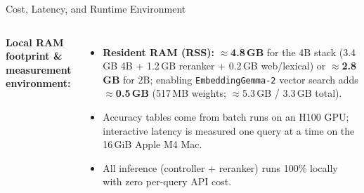 \documentclass[aspectratio=1610,11pt]{beamer}
\begin{document}
\begin{frame}{Cost, Latency, and Runtime Environment}
\begin{columns}[T]
    \footnotesize
    \textbf{Local RAM footprint \& measurement environment:}
    \begin{itemize}\footnotesize
      \item \textbf{Resident RAM (RSS):} $\approx$\textbf{4.8\,GB} for the 4B stack (3.4\,GB 4B + 1.2\,GB reranker + 0.2\,GB web/lexical) or $\approx$\textbf{2.8\,GB} for 2B; enabling \texttt{EmbeddingGemma-2} vector search adds $\approx$\textbf{0.5\,GB} (517\,MB weights; $\approx$5.3\,GB / 3.3\,GB total).
      \item Accuracy tables come from batch runs on an H100 GPU; interactive latency is measured one query at a time on the 16\,GiB Apple M4 Mac.
      \item All inference (controller + reranker) runs 100\% locally with zero per-query API cost.
    \end{itemize}
  \end{columns}
\end{frame}
\end{document}
